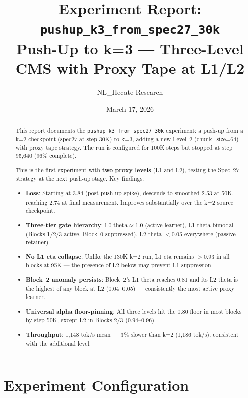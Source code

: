 \documentclass[11pt,a4paper]{article}
\title{Experiment Report: \texttt{pushup\_k3\_from\_spec27\_30k}\\[0.3em]
\large Push-Up to k=3 --- Three-Level CMS with Proxy Tape at L1/L2}
\author{NL\_Hecate Research}
\date{March 17, 2026}
\begin{document}
\maketitle

\begin{abstract}
This report documents the \texttt{pushup\_k3\_from\_spec27\_30k} experiment: a push-up from
a k=2 checkpoint (spec27 at step 30K) to k=3, adding a new Level~2 (chunk\_size=64) with proxy
tape strategy. The run is configured for 100K steps but stopped at step 95,640 (96\% complete).

This is the first experiment with \textbf{two proxy levels} (L1 and L2), testing the Spec~27 strategy
at the next push-up stage. Key findings:

\begin{itemize}
    \item \textbf{Loss}: Starting at 3.84 (post-push-up spike), descends to smoothed 2.53 at 50K,
          reaching 2.74 at final measurement. Improves substantially over the k=2 source checkpoint.
    \item \textbf{Three-tier gate hierarchy}: L0 theta$\approx$1.0 (active learner), L1 theta bimodal
          (Blocks 1/2/3 active, Block~0 suppressed), L2 theta $<$0.05 everywhere (passive retainer).
    \item \textbf{No L1 eta collapse}: Unlike the 130K k=2 run, L1 eta remains $>$0.93 in all blocks
          at 95K --- the presence of L2 below may prevent L1 suppression.
    \item \textbf{Block~2 anomaly persists}: Block~2's L1 theta reaches 0.81 and its L2 theta is
          the highest of any block at L2 (0.04--0.05) --- consistently the most active proxy learner.
    \item \textbf{Universal alpha floor-pinning}: All three levels hit the 0.80 floor in most blocks
          by step 50K, except L2 in Blocks 2/3 (0.94--0.96).
    \item \textbf{Throughput}: 1,148 tok/s mean --- 3\% slower than k=2 (1,186 tok/s), consistent
          with the additional level.
\end{itemize}
\end{abstract}

\tableofcontents
\newpage

\section{Experiment Configuration}
\end{document}
